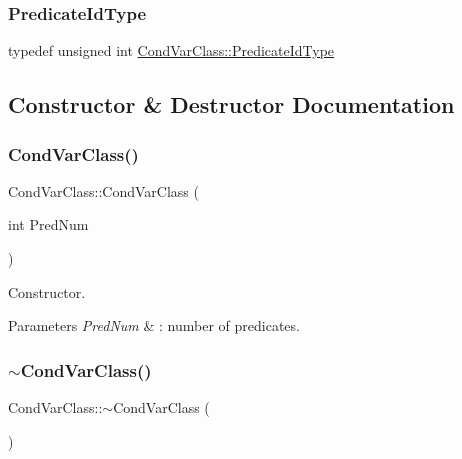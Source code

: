 \subsubsection{\texorpdfstring{Predicate\+Id\+Type}{PredicateIdType}}
{\footnotesize\ttfamily typedef unsigned int \hyperlink{classCondVarClass_a8e27f99972b8b95f064d6657a4583a5b}{Cond\+Var\+Class\+::\+Predicate\+Id\+Type}}



\subsection{Constructor \& Destructor Documentation}
\mbox{\label{classCondVarClass_a03da5f7409d43577a5831dc350e3e2dd}} 
\subsubsection{\texorpdfstring{Cond\+Var\+Class()}{CondVarClass()}}
{\footnotesize\ttfamily Cond\+Var\+Class\+::\+Cond\+Var\+Class (\begin{DoxyParamCaption}\item[{int}]{Pred\+Num }\end{DoxyParamCaption})\hspace{0.3cm}{\ttfamily [noexcept]}}

Constructor. 
\begin{DoxyParams}{Parameters}
{\em Pred\+Num} & \+: number of predicates. \\
\hline
\end{DoxyParams}
\mbox{\label{classCondVarClass_ac6095148586b51ec4b2425628e21e225}} 
\subsubsection{\texorpdfstring{$\sim$\+Cond\+Var\+Class()}{~CondVarClass()}}
{\footnotesize\ttfamily Cond\+Var\+Class\+::$\sim$\+Cond\+Var\+Class (\begin{DoxyParamCaption}{ }\end{DoxyParamCaption})\hspace{0.3cm}{\ttfamily [virtual]}}



